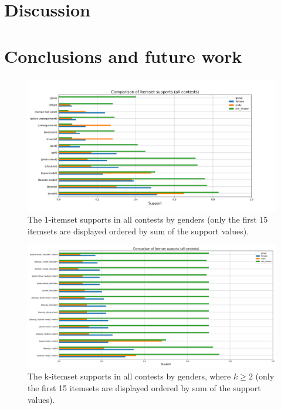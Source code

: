 \documentclass[english]{tktltiki}
\begin{document}
	\section{Discussion}
	\label{section::discussion}
	
	\pagebreak

	\section{Conclusions and future work}
	\label{section::conclusions}
	
\pagebreak
\nocite{*}



\lastpage
\appendices
\pagestyle{empty}


\begin{figure}[h] 
    \begin{center}
        \includegraphics[width=1\textwidth,center]{Images/itemset_supports-gender-all_contests-1_itemset.png}
        \caption{The 1-itemset supports in all contests by genders (only the first 15 itemsets are displayed ordered by sum of the support values).}
    \end{center}
\end{figure}

\begin{figure}[h] 
    \begin{center}
        \includegraphics[width=1\textwidth,center]{Images/itemset_supports-gender-all_contests-over2_itemset.png}
        \caption{The k-itemset supports in all contests by genders, where $k \geq 2$ (only the first 15 itemsets are displayed ordered by sum of the support values).}
    \end{center}
\end{figure}
\end{document}
